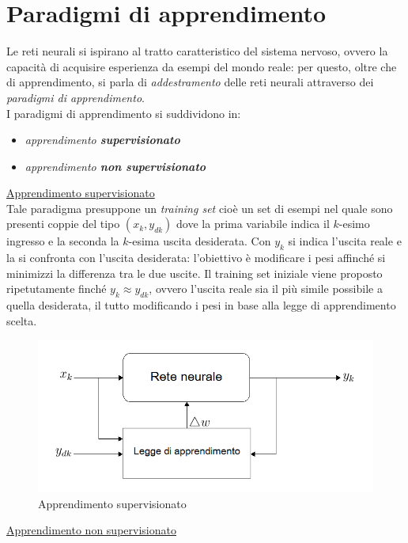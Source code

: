 \documentclass[12pt,a4paper,oneside]{book}
\begin{document}
	\section{Paradigmi di apprendimento}	
		Le reti neurali si ispirano al tratto caratteristico del sistema nervoso, ovvero la capacità di acquisire esperienza da esempi del mondo reale: per questo, oltre che di apprendimento, si parla di \emph{addestramento} delle reti neurali attraverso dei \textit{paradigmi di apprendimento}.\\
		I paradigmi di apprendimento si suddividono in:
		
		\begin{itemize}
			\item \emph{apprendimento \textbf{supervisionato} }
			\item \emph{apprendimento \textbf{non supervisionato}}
		\end{itemize}
	
		\underline{Apprendimento supervisionato}\\
		Tale paradigma presuppone un \emph{training set} cioè un set di esempi nel quale sono presenti coppie del tipo $(x_{k},y_{dk})$ dove la prima variabile indica il $k$-esimo ingresso e la seconda la $k$-esima uscita desiderata. Con $y_{k}$ si indica l'uscita reale e la si confronta con l'uscita desiderata: l'obiettivo è modificare i pesi affinché si minimizzi la differenza tra le due uscite. Il training set iniziale viene proposto ripetutamente finché $y_{k}\approx y_{dk}$, ovvero l'uscita reale sia il più simile possibile a quella desiderata, il tutto modificando i pesi in base alla legge di apprendimento scelta.\\
	
		\begin{figure}[h]
			\centering
			\includegraphics[width=0.8\linewidth]{IMMAGINI/supervisionato}
			\caption{ Apprendimento supervisionato }
			\label{fig:supervisionato}
		\end{figure}
		
		\underline{Apprendimento non supervisionato}\\
		
\end{document}

